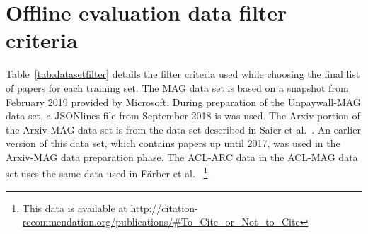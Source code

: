 \chapter{Offline evaluation data filter criteria}\label{chap:offlineevalfilter}

Table~\ref{tab:datasetfilter} details the filter criteria used while choosing the final list of papers for each training set. The MAG data set is based on a snapshot from February 2019 provided by Microsoft. During preparation of the Unpaywall-MAG data set, a JSONlines file from September 2018 is was used. The Arxiv portion of the Arxiv-MAG data set is from the data set described in Saier et al.~\cite{SaierF19}. An earlier version of this data set, which contains papers up until 2017, was used in the Arxiv-MAG data preparation phase. The ACL-ARC data in the ACL-MAG data set uses the same data used in Färber et al.~\cite{Faerber2018b} \footnote{This data is available at \url{http://citation-recommendation.org/publications/#To_Cite_or_Not_to_Cite}}.


